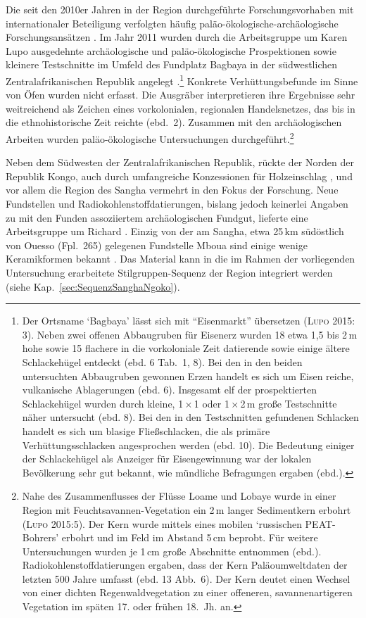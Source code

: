 Die seit den 2010er Jahren in der Region durchgeführte Forschungsvorhaben mit internationaler Beteiligung verfolgten häufig paläo-ökologische-archäologische Forschungsansätzen \parencites[siehe][]{Kiahtipes.2011}{Kiahtipes.2016}{Gillet.2013}{MorinRivat.2014}. Im Jahr 2011 wurden durch die Arbeitsgruppe um Karen Lupo ausgedehnte archäologische und paläo-ökologische Prospektionen sowie kleinere Testschnitte im Umfeld des Fundplatz Bagbaya in der südwestlichen Zentralafrikanischen Republik angelegt \parencite{Lupo.2015}.\footnote{Der Ortsname \enquote*{Bagbaya} lässt sich mit \enquote{Eisenmarkt} übersetzen (\textsc{Lupo} 2015: 3). Neben zwei offenen Abbaugruben für Eisenerz wurden 18 etwa 1,5 bis 2\,m hohe sowie 15 flachere in die vorkoloniale Zeit datierende sowie einige ältere Schlackehügel entdeckt (ebd. 6 Tab.~1, 8). Bei den in den beiden untersuchten Abbaugruben gewonnen Erzen handelt es sich um Eisen reiche, vulkanische Ablagerungen (ebd. 6). Insgesamt elf der prospektierten Schlackehügel wurden durch kleine, 1\,$\times$\,1 oder 1\,$\times$\,2\,m große Testschnitte näher untersucht (ebd. 8). Bei den in den Testschnitten gefundenen Schlacken handelt es sich um blasige Fließschlacken, die als primäre Verhüttungsschlacken angesprochen werden (ebd. 10). Die Bedeutung einiger der Schlackehügel als Anzeiger für Eisengewinnung war der lokalen Bevölkerung sehr gut bekannt, wie mündliche Befragungen ergaben (ebd.).} Konkrete Verhüttungsbefunde im Sinne von Öfen wurden nicht erfasst. Die Ausgräber interpretieren ihre Ergebnisse sehr weitreichend als Zeichen eines vorkolonialen, regionalen Handelsnetzes, das bis in die ethnohistorische Zeit reichte (ebd.~2). Zusammen mit den archäologischen Arbeiten wurden paläo-ökologische Untersuchungen durchgeführt.\footnote{Nahe des Zusammenflusses der Flüsse Loame und Lobaye wurde in einer Region mit Feuchtsavannen-Vegetation ein 2\,m langer Sedimentkern erbohrt (\textsc{Lupo} 2015:5). Der Kern wurde mittels eines mobilen \enquote*{russischen PEAT-Bohrers} erbohrt und im Feld im Abstand 5\,cm beprobt. Für weitere Untersuchungen wurden je 1\,cm große Abschnitte entnommen (ebd.). Radiokohlenstoffdatierungen ergaben, dass der Kern Paläoumweltdaten der letzten 500 Jahre umfasst (ebd. 13 Abb.~6). Der Kern deutet einen Wechsel von einer dichten Regenwaldvegetation zu einer offeneren, savannenartigeren Vegetation im späten 17. oder frühen 18.~Jh. an.}

Neben dem Südwesten der Zentralafrikanischen Republik, rückte der Norden der Republik Kongo, auch durch umfangreiche Konzessionen für Holzeinschlag \parencite[siehe][Abb.~S3]{Gond.2013}, und vor allem die Region des Sangha vermehrt in den Fokus der Forschung. Neue Fundstellen und Radiokohlenstoffdatierungen, bislang jedoch keinerlei Angaben zu mit den Funden assoziiertem archäologischen Fundgut, lieferte eine Arbeitsgruppe um Richard \textcites{Oslisly.2013b}{MorinRivat.2014}. Einzig von der am Sangha, etwa 25\,km südöstlich von Ouesso (Fpl.~265) gelegenen Fundstelle Mboua sind einige wenige Keramikformen bekannt \parencite[95 Abb.~31, 114 Abb.~42]{Gillet.2013}. Das Material kann in die im Rahmen der vorliegenden Untersuchung erarbeitete Stilgruppen-Sequenz der Region integriert werden (siehe Kap.~\ref{sec:SequenzSanghaNgoko}).

